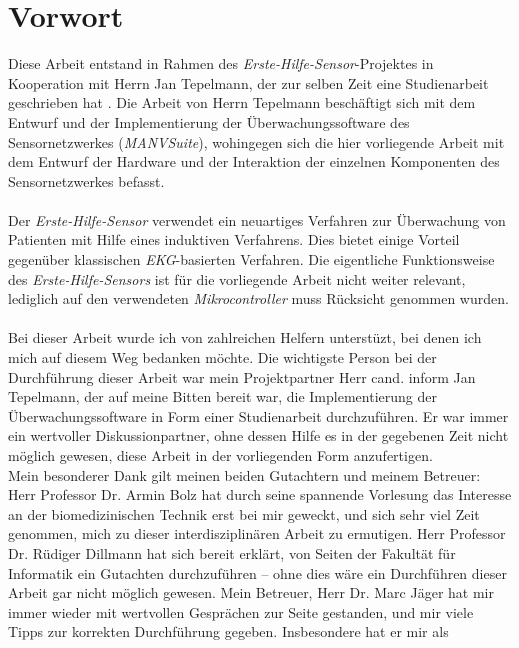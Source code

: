 \chapter*{Vorwort} 

Diese Arbeit entstand in Rahmen des \emph{Erste-Hilfe-Sensor}-Projektes in Kooperation mit Herrn Jan Tepelmann,
der zur selben Zeit eine Studienarbeit geschrieben hat \cite{Jan}. Die Arbeit von Herrn Tepelmann
beschäftigt sich mit dem Entwurf und der Implementierung der Überwachungssoftware des Sensornetzwerkes
(\emph{MANVSuite}), wohingegen sich die hier vorliegende Arbeit mit dem Entwurf der Hardware und der Interaktion der
einzelnen Komponenten des Sensornetzwerkes befasst.\\
\\
Der \emph{Erste-Hilfe-Sensor} verwendet ein neuartiges Verfahren zur Überwachung von Patienten mit Hilfe eines induktiven
Verfahrens. Dies bietet einige Vorteil gegenüber klassischen \emph{EKG}-basierten Verfahren. Die eigentliche Funktionsweise
des \emph{Erste-Hilfe-Sensors} ist für die vorliegende Arbeit nicht weiter relevant, lediglich auf den verwendeten
\emph{Mikrocontroller} muss Rücksicht genommen wurden.\\
\\
Bei dieser Arbeit wurde ich von zahlreichen Helfern unterstüzt, bei denen ich mich auf diesem Weg bedanken möchte. 
Die wichtigste Person bei der Durchführung dieser Arbeit war mein Projektpartner Herr cand. inform Jan Tepelmann, der 
auf meine Bitten bereit war, die Implementierung der Überwachungssoftware in Form einer Studienarbeit durchzuführen. Er
war immer ein wertvoller Diskussionpartner, ohne dessen Hilfe es in der gegebenen Zeit nicht möglich gewesen, 
diese Arbeit in der vorliegenden Form anzufertigen.\\
Mein besonderer Dank gilt meinen beiden Gutachtern und meinem Betreuer: Herr Professor Dr. Armin Bolz hat durch seine 
spannende Vorlesung das Interesse an der biomedizinischen Technik erst bei mir geweckt, und sich sehr viel Zeit 
genommen, mich zu dieser interdisziplinären Arbeit zu ermutigen. Herr Professor Dr. Rüdiger Dillmann hat sich bereit 
erklärt, von Seiten der Fakultät für Informatik ein Gutachten durchzuführen -- ohne dies wäre ein Durchführen 
dieser Arbeit gar nicht möglich gewesen. Mein Betreuer, Herr Dr. Marc Jäger hat mir immer wieder mit wertvollen Gesprächen
zur Seite gestanden, und mir viele Tipps zur korrekten Durchführung gegeben. Insbesondere hat er mir als 
